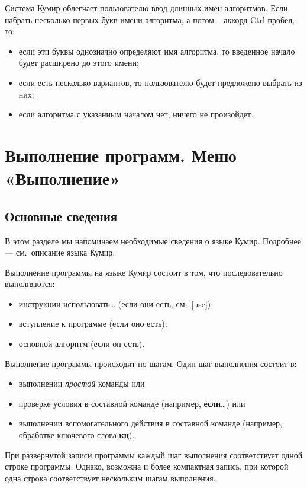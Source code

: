 \documentclass[12pt,a4paper]{article}
\begin{document}
Система Кумир облегчает пользователю ввод длинных имен алгоритмов. Если набрать несколько первых букв имени алгоритма, а потом – аккорд \textsf{Ctrl}-пробел, то:
\begin{itemize}
\item если эти буквы однозначно определяют имя алгоритма, то введенное начало будет расширено до этого имени;
\item если есть несколько вариантов, то пользователю будет предложено выбрать из них;
\item если алгоритма с указанным началом нет, ничего не произойдет.
\end{itemize}

\section{Выполнение программ. Меню «Выполнение»}
\label{run}

\subsection{Основные сведения}

В этом разделе мы напоминаем необходимые сведения о языке Кумир. Подробнее --- см.~описание языка Кумир.

Выполнение программы на языке Кумир состоит в том, что последовательно выполняются:
\begin{itemize}
\item инструкции \textsf{использовать\dots} (если они есть, см.~\ref{use});
\item вступление к программе (если оно есть);
\item основной алгоритм (если он есть).
\end{itemize}

Выполнение программы происходит по шагам. Один шаг выполнения состоит в:
\begin{itemize}
\item выполнении \emph{простой} команды или 
\item проверке условия в составной команде (например, \textsf{\textbf{если}\dots}) или 
\item выполнении вспомогательного действия в составной команде (например, обработке ключевого слова \textsf{\textbf{кц}}).
\end{itemize}

При развернутой записи программы каждый шаг выполнения соответствует одной строке программы. Однако, возможна и более компактная запись, при которой одна строка соответствует нескольким шагам выполнения.
\end{document}
